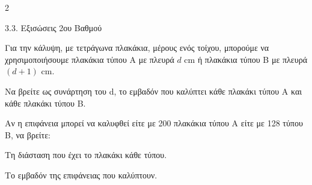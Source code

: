 \begin{ylh}{2}
    \item 3.3. Εξισώσεις 2ου Βαθμού
\end{ylh}
Για την κάλυψη, με τετράγωνα πλακάκια, μέρους ενός τοίχου, μπορούμε να χρησιμοποιήσουμε πλακάκια τύπου Α με πλευρά $d\text{ cm}$ ή πλακάκια τύπου Β με πλευρά $(d+1)\text{ cm}$.

\begin{alist}
\item Να βρείτε ως συνάρτηση του d, το εμβαδόν που καλύπτει κάθε πλακάκι τύπου Α και κάθε πλακάκι τύπου Β.
\item Αν η επιφάνεια μπορεί να καλυφθεί είτε με 200 πλακάκια τύπου Α είτε με 128 τύπου Β, να βρείτε:
\begin{rlist}
\item
  Τη διάσταση που έχει το πλακάκι κάθε τύπου.
\item
  Το εμβαδόν της επιφάνειας που καλύπτουν.
\end{rlist}
\end{alist}

